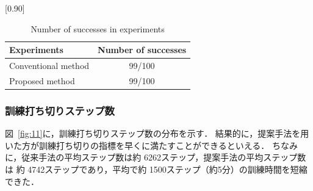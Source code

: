 \documentclass{jarticle}
\renewcommand{\figurename}{図~}
\newcommand{\figref}[1]{\figurename\ref{#1}}
\begin{document}
\newpage

\begin{table}[h!]
  \centering
  \caption{Number of successes in experiments}
  \label{table:2}
    \scalebox{0.90}[0.90] {
    \begin{tabular}{|l||c|}
      \hline
      Experiments & Number of successes \\
      \hline\hline
      Conventional method & 99/100 \\
      \hline
      Proposed method & 99/100\\
      \hline 
    \end{tabular} }
\end{table}

\subsubsection{訓練打ち切りステップ数}
\figref{fig:11}に，訓練打ち切りステップ数の分布を示す．
結果的に，提案手法を用いた方が訓練打ち切りの指標を早くに満たすことができるといえる．
ちなみに，従来手法の平均ステップ数は約 6262ステップ，提案手法の平均ステップ数は
約 4742ステップであり，平均で約 1500ステップ（約5分）の訓練時間を短縮できた．
\end{document}
